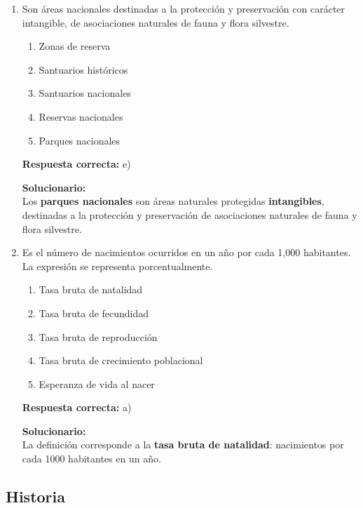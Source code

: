 \begin{enumerate}


\item Son áreas nacionales destinadas a la protección y preservación con carácter intangible, de asociaciones naturales de fauna y flora silvestre.
\begin{enumerate}[label=\alph*)]
	\item Zonas de reserva
	\item Santuarios históricos
	\item Santuarios nacionales
	\item Reservas nacionales
	\item Parques nacionales
\end{enumerate}

\textbf{Respuesta correcta:} e)

\vspace{2mm}
\textbf{Solucionario:}\\
Los \textbf{parques nacionales} son áreas naturales protegidas \textbf{intangibles}, destinadas a la protección y preservación de asociaciones naturales de fauna y flora silvestre.

\item  Es el número de nacimientos ocurridos en un año por cada 1,000 habitantes. La expresión se representa porcentualmente.
\begin{enumerate}[label=\alph*)]
	\item Tasa bruta de natalidad
	\item Tasa bruta de fecundidad
	\item Tasa bruta de reproducción
	\item Tasa bruta de crecimiento poblacional
	\item Esperanza de vida al nacer
\end{enumerate}

\textbf{Respuesta correcta:} a)

\vspace{2mm}
\textbf{Solucionario:}\\
La definición corresponde a la \textbf{tasa bruta de natalidad}: nacimientos por cada 1000 habitantes en un año.




\end{enumerate}







\subsection*{Historia}


